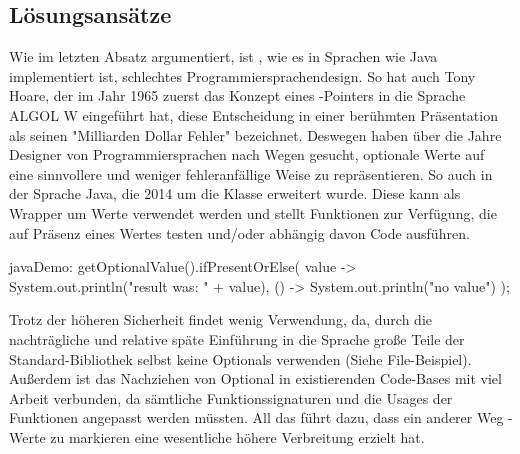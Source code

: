 \subsection{Lösungsansätze}
Wie im letzten Absatz argumentiert, ist , wie es in Sprachen wie Java implementiert ist, schlechtes
Programmiersprachendesign.
So hat auch Tony Hoare, der im Jahr 1965 zuerst das Konzept eines -Pointers in die Sprache ALGOL W
eingeführt hat, diese Entscheidung in einer berühmten Präsentation als seinen "Milliarden Dollar Fehler" bezeichnet.
Deswegen haben über die Jahre Designer von Programmiersprachen nach Wegen gesucht, optionale Werte auf eine sinnvollere
und weniger fehleranfällige Weise zu repräsentieren.
So auch in der Sprache Java, die 2014 um die  Klasse erweitert wurde.
Diese kann als Wrapper um Werte verwendet werden und stellt Funktionen zur Verfügung, die auf Präsenz eines Wertes
testen und/oder abhängig davon Code ausführen.

\begin{codeBlock}{java}{Demo: }
getOptionalValue().ifPresentOrElse(
    value -> System.out.println("result was: " + value),
    () -> System.out.println("no value")
);
\end{codeBlock}

Trotz der höheren Sicherheit findet  wenig Verwendung, da, durch die nachträgliche und relative
späte Einführung in die Sprache große Teile der Standard-Bibliothek selbst keine Optionals verwenden (Siehe
File-Beispiel).
Außerdem ist das Nachziehen von Optional in existierenden Code-Bases mit viel Arbeit verbunden, da sämtliche
Funktionssignaturen und die Usages der Funktionen angepasst werden müssten.
All das führt dazu, dass ein anderer Weg -Werte zu markieren eine wesentliche höhere Verbreitung
erzielt hat.

